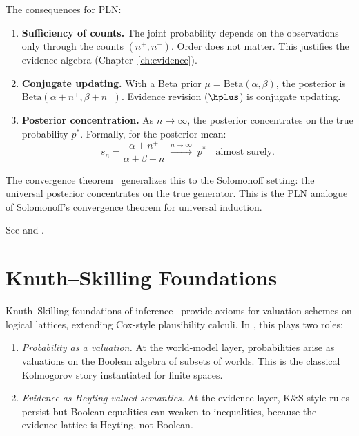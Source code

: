 \documentclass[11pt,openany]{report}
\begin{document}
The consequences for PLN:
\begin{enumerate}
\item \textbf{Sufficiency of counts.}  The joint probability depends
  on the observations only through the counts $(n^+, n^-)$.  Order
  does not matter.  This justifies the evidence algebra
  (Chapter~\ref{ch:evidence}).

\item \textbf{Conjugate updating.}  With a Beta prior
  $\mu = \mathrm{Beta}(\alpha, \beta)$, the posterior is
  $\mathrm{Beta}(\alpha + n^+, \beta + n^-)$.  Evidence revision
  ($\hplus$) is conjugate updating.

\item \textbf{Posterior concentration.}  As $n \to \infty$, the
  posterior concentrates on the true probability $p^*$.
  Formally, for the posterior mean:
  \[
    s_n = \frac{\alpha + n^+}{\alpha + \beta + n} \;\xrightarrow{n \to \infty}\; p^*
    \quad \text{almost surely.}
  \]
\end{enumerate}

The \nuPLN{} convergence theorem~\cite{nuPLN2026} generalizes this
to the Solomonoff setting: the universal posterior concentrates on the
true generator.  This is the PLN analogue of Solomonoff's convergence
theorem for universal induction.

See  and
.

\section{Knuth--Skilling Foundations}

Knuth--Skilling foundations of inference~\cite{KnuthSkilling2012} provide
axioms for valuation schemes on logical lattices, extending Cox-style
plausibility calculi.  In \xiPLN{}, this plays two roles:

\begin{enumerate}
\item \emph{Probability as a valuation.}  At the world-model layer,
  probabilities arise as valuations on the Boolean algebra of subsets of
  worlds.  This is the classical Kolmogorov story instantiated for finite
  spaces.

\item \emph{Evidence as Heyting-valued semantics.}  At the evidence
  layer, K\&S-style rules persist but Boolean equalities can weaken to
  inequalities, because the evidence lattice is Heyting, not Boolean.
\end{enumerate}
\end{document}
